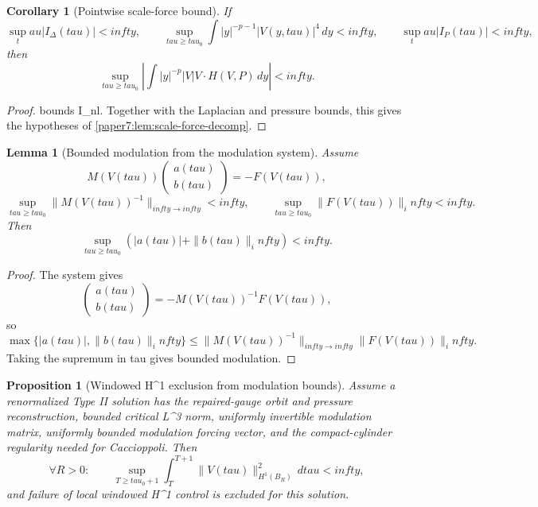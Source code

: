 \documentclass[11pt]{amsart}
\def\({}%
\def\){}%
\def\tau{tau}%
\def\infty{infty}%
\theoremstyle{plain}
\newtheorem{lemma}[lemma]{Lemma}
\newtheorem{proposition}[proposition]{Proposition}
\newtheorem{corollary}[corollary]{Corollary}
\theoremstyle{definition}
\theoremstyle{remark}
\begin{document}
\begin{corollary}[Pointwise scale-force bound]\label{paper7:cor:scale-force-bound}
If
\[
  \sup_\tau |I_\Delta(\tau)|<\infty,\qquad
  \sup_{\tau\ge\tau_0}\int |y|^{-p-1}|V(y,\tau)|^4\,dy<\infty,\qquad
  \sup_\tau |I_P(\tau)|<\infty,
\]
then
\[
  \sup_{\tau\ge\tau_0}
  \left|
  \int |y|^{-p}|V|V\cdot H(V,P)\,dy
  \right|<\infty.
\]
\end{corollary}

\begin{proof}
 bounds \(I_{\rm nl}\).  Together
with the Laplacian and pressure bounds, this gives the hypotheses of
\cref{paper7:lem:scale-force-decomp}.
\end{proof}

\begin{lemma}[Bounded modulation from the modulation system]
\label{paper7:lem:bounded-mod-from-system}
Assume
\[
  M(V(\tau))
  \begin{pmatrix}
  a(\tau)\\ b(\tau)
  \end{pmatrix}
  =-F(V(\tau)),
\]
\[
  \sup_{\tau\ge\tau_0}\|M(V(\tau))^{-1}\|_{\infty\to\infty}<\infty,
  \qquad
  \sup_{\tau\ge\tau_0}\|F(V(\tau))\|_\infty<\infty.
\]
Then
\[
  \sup_{\tau\ge\tau_0}(|a(\tau)|+\|b(\tau)\|_\infty)<\infty.
\]
\end{lemma}

\begin{proof}
The system gives
\[
  \begin{pmatrix}
  a(\tau)\\ b(\tau)
  \end{pmatrix}
  =-M(V(\tau))^{-1}F(V(\tau)),
\]
so
\[
  \max\{|a(\tau)|,\|b(\tau)\|_\infty\}
  \le
  \|M(V(\tau))^{-1}\|_{\infty\to\infty}\|F(V(\tau))\|_\infty.
\]
Taking the supremum in \(\tau\) gives bounded modulation.
\end{proof}

\begin{proposition}[Windowed \(H^1\) exclusion from modulation bounds]\label{paper7:prop:windowed-h1-from-modulation}
Assume a renormalized Type II solution has the repaired-gauge orbit and pressure
reconstruction, bounded critical \(L^3\) norm, uniformly invertible modulation
matrix, uniformly bounded modulation forcing vector, and the compact-cylinder
regularity needed for Caccioppoli.  Then
\[
  \forall R>0:\qquad
  \sup_{T\ge\tau_0+1}
  \int_T^{T+1}\|V(\tau)\|_{H^1(B_R)}^2\,d\tau<\infty,
\]
and failure of local windowed \(H^1\) control is excluded for this solution.
\end{proposition}
\end{document}
